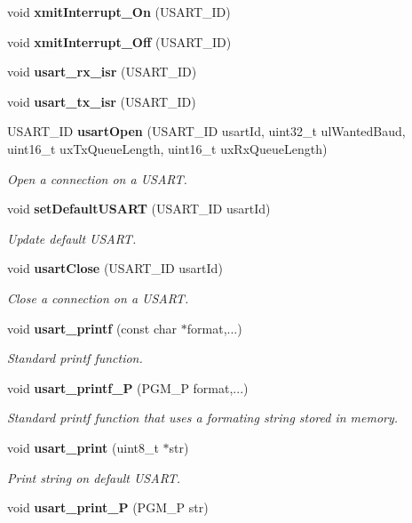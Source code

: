\begin{DoxyCompactItemize}
\item 
void {\bf xmit\+Interrupt\+\_\+\+On} (U\+S\+A\+R\+T\+\_\+\+I\+D)
\item 
void {\bf xmit\+Interrupt\+\_\+\+Off} (U\+S\+A\+R\+T\+\_\+\+I\+D)
\item 
void {\bf usart\+\_\+rx\+\_\+isr} (U\+S\+A\+R\+T\+\_\+\+I\+D)
\item 
void {\bf usart\+\_\+tx\+\_\+isr} (U\+S\+A\+R\+T\+\_\+\+I\+D)
\item 
U\+S\+A\+R\+T\+\_\+\+I\+D {\bf usart\+Open} (U\+S\+A\+R\+T\+\_\+\+I\+D usart\+Id, uint32\+\_\+t ul\+Wanted\+Baud, uint16\+\_\+t ux\+Tx\+Queue\+Length, uint16\+\_\+t ux\+Rx\+Queue\+Length)
\begin{DoxyCompactList}\small\item\em Open a connection on a U\+S\+A\+R\+T. \end{DoxyCompactList}\item 
void {\bf set\+Default\+U\+S\+A\+R\+T} (U\+S\+A\+R\+T\+\_\+\+I\+D usart\+Id)
\begin{DoxyCompactList}\small\item\em Update default U\+S\+A\+R\+T. \end{DoxyCompactList}\item 
void {\bf usart\+Close} (U\+S\+A\+R\+T\+\_\+\+I\+D usart\+Id)
\begin{DoxyCompactList}\small\item\em Close a connection on a U\+S\+A\+R\+T. \end{DoxyCompactList}\item 
void {\bf usart\+\_\+printf} (const char $\ast$format,...)
\begin{DoxyCompactList}\small\item\em Standard printf function. \end{DoxyCompactList}\item 
void {\bf usart\+\_\+printf\+\_\+\+P} (P\+G\+M\+\_\+\+P format,...)
\begin{DoxyCompactList}\small\item\em Standard printf function that uses a formating string stored in memory. \end{DoxyCompactList}\item 
void {\bf usart\+\_\+print} (uint8\+\_\+t $\ast$str)
\begin{DoxyCompactList}\small\item\em Print string on default U\+S\+A\+R\+T. \end{DoxyCompactList}\item 
void {\bf usart\+\_\+print\+\_\+\+P} (P\+G\+M\+\_\+\+P str)

\end{DoxyCompactItemize}

